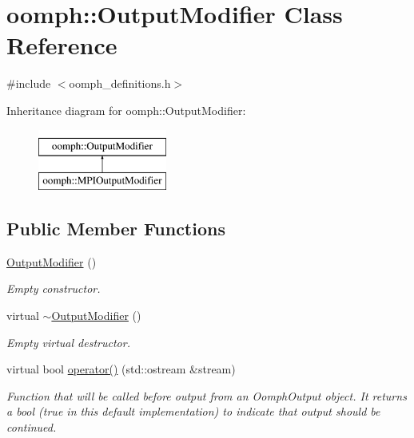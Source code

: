 \hypertarget{classoomph_1_1OutputModifier}{}\section{oomph\+:\+:Output\+Modifier Class Reference}
\label{classoomph_1_1OutputModifier}


{\ttfamily \#include $<$oomph\+\_\+definitions.\+h$>$}

Inheritance diagram for oomph\+:\+:Output\+Modifier\+:\begin{figure}[H]
\begin{center}
\leavevmode
\includegraphics[height=2.000000cm]{classoomph_1_1OutputModifier}
\end{center}
\end{figure}
\subsection*{Public Member Functions}
\begin{DoxyCompactItemize}
\item 
\hyperlink{classoomph_1_1OutputModifier_ab7e4b4d9e455cc93204160e70e2d50f6}{Output\+Modifier} ()
\begin{DoxyCompactList}\small\item\em Empty constructor. \end{DoxyCompactList}\item 
virtual \hyperlink{classoomph_1_1OutputModifier_aa8a586ce54aeae7d1d0d5a075dd5b172}{$\sim$\+Output\+Modifier} ()
\begin{DoxyCompactList}\small\item\em Empty virtual destructor. \end{DoxyCompactList}\item 
virtual bool \hyperlink{classoomph_1_1OutputModifier_ae2d5a2d19865858377b5113ca84aa423}{operator()} (std\+::ostream \&stream)
\begin{DoxyCompactList}\small\item\em Function that will be called before output from an Oomph\+Output object. It returns a bool (true in this default implementation) to indicate that output should be continued. \end{DoxyCompactList}\end{DoxyCompactItemize}



